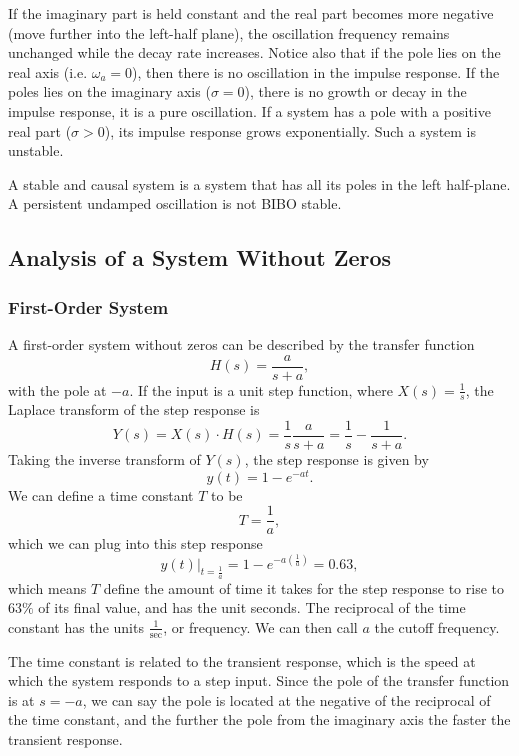 \documentclass{article}
\begin{document}
If the imaginary part is held constant and the real part becomes more negative (move further into the left-half plane), the oscillation frequency remains unchanged while the decay rate increases. Notice also that if the pole lies on the real axis (i.e. $\omega _a=0$), then there is no oscillation in the impulse response. If the poles lies on the imaginary axis ($\sigma =0$), there is no growth or decay in the impulse response, it is a pure oscillation. If a system has a pole with a positive real part ($\sigma >0$), its impulse response grows exponentially. Such a system is unstable.

A stable and causal system is a system that has all its poles in the left half-plane. A persistent undamped oscillation is not BIBO stable.

\subsection{Analysis of a System Without Zeros}
\subsubsection{First-Order System}
A first-order system without zeros can be described by the transfer function
\[
    H(s)=\frac{a}{s+a},
\]
with the pole at $-a$. If the input is a unit step function, where $X(s)=\frac{1}{s}$, the Laplace transform of the step response is
\[
    Y(s)=X(s)\cdot H(s)=\frac{1}{s}\frac{a}{s+a}=\frac{1}{s}-\frac{1}{s+a}.
\]
Taking the inverse transform of $Y(s)$, the step response is given by
\[
    y(t)=1-e^{-at}.
\]
We can define a time constant $T$ to be
\[
    T=\frac{1}{a},
\]
which we can plug into this step response
\[
    y(t)\bigg\rvert_{t=\frac{1}{a}}=1-e^{-a \left( \frac{1}{a} \right)}=0.63,
\]
which means $T$ define the amount of time it takes for the step response to rise to $63\%$ of its final value, and has the unit seconds. The reciprocal of the time constant has the units $\frac{1}{\text{sec}}$, or frequency. We can then call $a$ the cutoff frequency.

The time constant is related to the transient response, which is the speed at which the system responds to a step input. Since the pole of the transfer function is at $s=-a$, we can say the pole is located at the negative of the reciprocal of the time constant, and the further the pole from the imaginary axis the faster the transient response.
\end{document}

